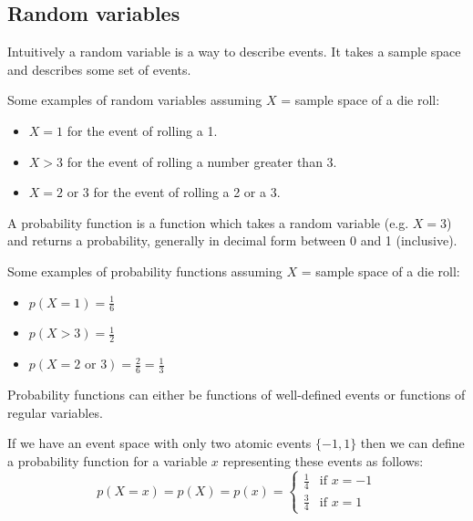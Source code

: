 \documentclass[12pt]{article}
\begin{document}
\subsection{Random variables}

\begin{definition}
    Intuitively a random variable is a way to describe events. It takes a sample space and describes some set of events.
\end{definition}

Some examples of random variables assuming $X$ = sample space of a die roll:
\begin{itemize}[leftmargin=*, noitemsep]
    \item $X = 1$ for the event of rolling a 1.
    \item $X > 3$ for the event of rolling a number greater than 3.
    \item $X = 2 \text{ or } 3$ for the event of rolling a 2 or a 3.
\end{itemize}

\begin{definition}
    A probability function is a function which takes a random variable (e.g. $X = 3$) and returns a probability, generally in decimal form between 0 and 1 (inclusive).
\end{definition}

Some examples of probability functions assuming $X$ = sample space of a die roll:
\begin{itemize}[leftmargin=*, noitemsep]
    \item $p(X = 1) = \frac{1}{6}$
    \item $p(X > 3) = \frac{1}{2}$
    \item $p(X = 2 \text{ or } 3) = \frac{2}{6} = \frac{1}{3}$
\end{itemize}

\begin{definition}[Probability function of regular variable $p(X = x)$]
    Probability functions can either be functions of well-defined events or functions of regular variables.
\end{definition}

If we have an event space with only two atomic events $\{-1, 1\}$ then we can define a probability function for a variable $x$ representing these events as follows:
\[
    p(X = x) = p(X) = p(x) = \begin{cases}
        \frac{1}{4} & \text{if } x = -1 \\
        \frac{3}{4} & \text{if } x = 1
    \end{cases}  
\]
\end{document}
